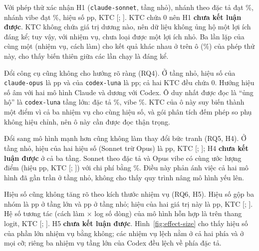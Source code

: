 Với phép thử xác nhận H1 (\texttt{claude-sonnet}, tầng nhỏ), nhánh theo đặc tả đạt
\NumResHOneSpecPct{}\%, nhánh vibe đạt \NumResHOneVibePct{}\%, hiệu số \NumResHOneEstPp{} pp, KTC
[\NumResHOneLowPp{}; \NumResHOneHighPp{}]. KTC chứa 0 nên H1 \textbf{chưa kết luận được}. KTC không chứa giá trị
dương nào, nên dữ liệu không ủng hộ một lợi ích đáng kể; tuy vậy, với \NumTasks{} nhiệm vụ, chưa loại được một
lợi ích nhỏ. Ba lần lặp của cùng một (nhiệm vụ, cách làm) cho kết quả khác nhau ở \NumResVarDisagree{} trên
\NumResVarCells{} ô (\NumResVarDisagreePct{}\%) của phép thử này, cho thấy biến thiên giữa các lần chạy là đáng
kể.

Đổi công cụ cũng không cho hướng rõ ràng (RQ4). Ở tầng nhỏ, hiệu số của \texttt{claude-opus} là \NumResOpusSmallDiffPp{} pp và của
\texttt{codex-luna} là \NumResCodexSmallDiffPp{} pp; cả hai KTC đều chứa 0. Hướng hiệu số âm với hai mô hình
Claude và dương với Codex. Ô duy nhất được đọc là ``ủng hộ'' là \texttt{codex-luna} tầng lớn: đặc tả
\NumResCodexLargeSpecPct{}\%, vibe \NumResCodexLargeVibePct{}\%. KTC của ô này suy biến thành một điểm vì cả ba
nhiệm vụ cho cùng hiệu số, và gói phân tích đếm \NumResSecondaryComparisons{} phép so phụ không hiệu chỉnh, nên
ô này cần được đọc thận trọng.

Đổi sang mô hình mạnh hơn cũng không làm thay đổi bức tranh (RQ5, H4). Ở tầng nhỏ, hiệu của hai hiệu số (Sonnet trừ Opus) là
\NumResHFourDiffOfDiffsPp{} pp, KTC [\NumResHFourDiffOfDiffsLowPp{}; \NumResHFourDiffOfDiffsHighPp{}]; H4
\textbf{chưa kết luận được} ở cả ba tầng. Sonnet theo đặc tả và Opus vibe có cùng ước lượng điểm (hiệu
\NumResHFourSonnetSpecOpusVibePp{} pp, KTC [\NumResHFourSonnetSpecOpusVibeLowPp{};
\NumResHFourSonnetSpecOpusVibeHighPp{}]) với chi phí bằng \NumResHFourCostRatioPct{}\%. Điều này phản ánh việc cả
hai mô hình đã gần trần ở tầng nhỏ, không cho thấy quy trình nâng mô hình yếu lên.

Hiệu số cũng không tăng rõ theo kích thước nhiệm vụ (RQ6, H5). Hiệu số gộp ba nhóm là \NumResHFiveLargePp{} pp ở tầng lớn và
\NumResHFiveSmallPp{} pp ở tầng nhỏ; hiệu của hai giá trị này là \NumResHFiveEstPp{} pp, KTC
[\NumResHFiveLowPp{}; \NumResHFiveHighPp{}]. Hệ số tương tác (cách làm $\times$ log số dòng) của mô hình hỗn hợp
là \NumResHFiveCoef{} trên thang logit, KTC [\NumResHFiveCoefLow{}; \NumResHFiveCoefHigh{}]. H5
\textbf{chưa kết luận được}. Hình~\ref{fig:effect-size} cho thấy hiệu số của phần lớn nhiệm vụ bằng không; các
nhiệm vụ lệch nằm ở cả hai phía và ở mọi cỡ; riêng ba nhiệm vụ tầng lớn của Codex đều lệch về phía đặc tả.

